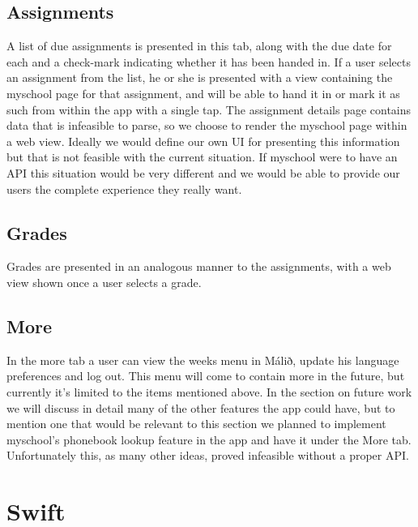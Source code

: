 \documentclass[pdftex, DIV=calc, paper=a4, fontsize=11pt, twocolumn]{scrartcl}	 %
\begin{document}
\subsection*{Assignments}

A list of due assignments is presented in this tab, along with the due date for each and a check-mark
indicating whether it has been handed in. If a user selects an assignment from the list, he or she
is presented with a view containing the myschool page for that assignment, and will be able to hand
it in or mark it as such from within the app with a single tap. The assignment details page contains
data that is infeasible to parse, so we choose to render the myschool page within a web view. Ideally
we would define our own UI for presenting this information but that is not feasible with the current
situation. If myschool were to have an API this situation would be very different and we would be
able to provide our users the complete experience they really want.

\subsection*{Grades}

Grades are presented in an analogous manner to the assignments, with a web view shown once a 
user selects a grade. 

\subsection*{More}

In the more tab a user can view the weeks menu in Málið, update his language preferences and log out.
This menu will come to contain more in the future, but currently it's limited to the items mentioned
above. In the section on future work we will discuss in detail many of the other features the app 
could have, but to mention one that would be relevant to this section we planned to implement
myschool's phonebook lookup feature in the app and have it under the More tab. Unfortunately this, as
many other ideas, proved infeasible without a proper API.



\section*{Swift}
\end{document}
